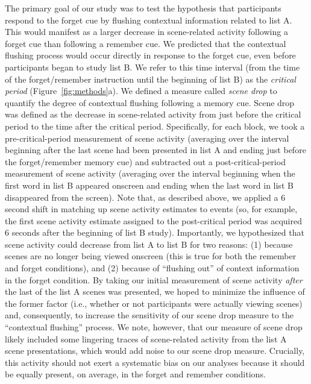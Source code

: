 \documentclass[11pt]{article}
\begin{document}
The primary goal of our study was to test the hypothesis that
participants respond to the forget cue by flushing contextual
information related to list A.  This would manifest as a larger
decrease in scene-related activity following a forget cue than
following a remember cue.  We predicted that the contextual flushing
process would occur directly in response to the forget cue, even
before participants began to study list B.  We refer to this time
interval (from the time of the forget/remember instruction until the
beginning of list B) as the \textit{critical period}
(Figure~\ref{fig:methods}a).  We defined a measure called
\textit{scene drop} to quantify the degree of contextual flushing
following a memory cue.  Scene drop was defined as the decrease in
scene-related activity from just before the critical period to the
time after the critical period. Specifically, for each block, we took
a pre-critical-period measurement of scene activity (averaging over
the interval beginning after the last scene had been presented in list
A and ending just before the forget/remember memory cue) and
subtracted out a post-critical-period measurement of scene activity
(averaging over the interval beginning when the first word in list B
appeared onscreen and ending when the last word in list B disappeared
from the screen).  Note that, as described above, we applied a 6
second shift in matching up scene activity estimates to events (so,
for example, the first scene activity estimate assigned to the
post-critical period was acquired 6 seconds after the beginning of
list B study).  Importantly, we hypothesized that scene activity could
decrease from list A to list B for two reasons: (1) because scenes are
no longer being viewed onscreen (this is true for both the remember
and forget conditions), and (2) because of ``flushing out'' of context
information in the forget condition. By taking our initial measurement
of scene activity \textit{after} the last of the list A scenes was
presented, we hoped to minimize the influence of the former factor
(i.e., whether or not participants were actually viewing scenes) and,
consequently, to increase the sensitivity of our scene drop measure to
the ``contextual flushing'' process.  We note, however, that our
measure of scene drop likely included some lingering traces of
scene-related activity from the list A scene presentations, which
would add noise to our scene drop measure.  Crucially, this activity
should not exert a systematic bias on our analyses because it should
be equally present, on average, in the forget and remember conditions.
\end{document}
